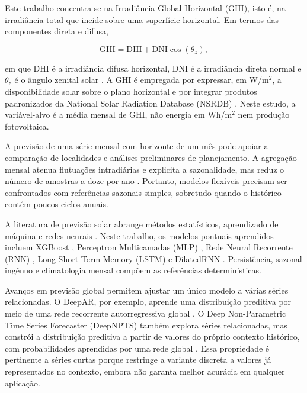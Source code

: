 \documentclass[10pt,conference,a4paper]{IEEEtran}
\begin{document}
Este trabalho concentra-se na Irradiância Global Horizontal (GHI), isto é, na
irradiância total que incide sobre uma superfície horizontal. Em termos das
componentes direta e difusa,

\begin{equation}
  \mathrm{GHI}=\mathrm{DHI}+\mathrm{DNI}\cos(\theta_z),
  \label{eq:ghi}
\end{equation}

\noindent em que DHI é a irradiância difusa horizontal, DNI é a irradiância
direta normal e $\theta_z$ é o ângulo zenital solar \cite{duffie2013}. A GHI é
empregada por expressar, em W/m$^2$, a disponibilidade solar sobre o plano
horizontal e por integrar produtos padronizados da National Solar Radiation
Database (NSRDB) \cite{sengupta2018}. Neste estudo, a variável-alvo é a média
mensal de GHI, não energia em Wh/m$^2$ nem produção fotovoltaica.

A previsão de uma série mensal com horizonte de um mês pode apoiar a comparação
de localidades e análises preliminares de planejamento. A agregação mensal
atenua flutuações intradiárias e explicita a sazonalidade, mas reduz o número de
amostras a doze por ano \cite{antonanzas2016,voyant2022}. Portanto, modelos
flexíveis precisam ser confrontados com referências sazonais simples, sobretudo
quando o histórico contém poucos ciclos anuais.

A literatura de previsão solar abrange métodos estatísticos, aprendizado de
máquina e redes neurais \cite{voyant2017,sobri2018}. Neste trabalho, os modelos
pontuais aprendidos incluem XGBoost \cite{chen2016}, Perceptron Multicamadas
(MLP) \cite{hornik1989}, Rede Neural Recorrente (RNN) \cite{elman1990}, Long
Short-Term Memory (LSTM) \cite{hochreiter1997} e DilatedRNN
\cite{chang2017}. Persistência, sazonal ingênuo e climatologia mensal compõem
as referências determinísticas.

Avanços em previsão global permitem ajustar um único modelo a várias séries
relacionadas. O DeepAR, por exemplo, aprende uma distribuição preditiva por
meio de uma rede recorrente autorregressiva global \cite{salinas2020}. O Deep
Non-Parametric Time Series Forecaster (DeepNPTS) também explora séries
relacionadas, mas constrói a distribuição preditiva a partir de valores do
próprio contexto histórico, com probabilidades aprendidas por uma rede global
\cite{rangapuram2023}. Essa propriedade é pertinente a séries curtas porque
restringe a variante discreta a valores já representados no contexto, embora
não garanta melhor acurácia em qualquer aplicação.
\end{document}
